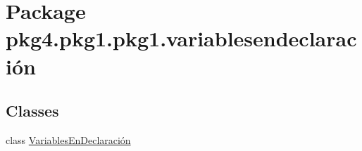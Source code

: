 \hypertarget{namespacepkg4_1_1pkg1_1_1pkg1_1_1variablesendeclaraci_xC3_xB3n}{}\section{Package pkg4.\+pkg1.\+pkg1.\+variablesendeclaración}
\label{namespacepkg4_1_1pkg1_1_1pkg1_1_1variablesendeclaraci_xC3_xB3n}
\subsection*{Classes}
\begin{DoxyCompactItemize}
\item 
class \mbox{\hyperlink{classpkg4_1_1pkg1_1_1pkg1_1_1variablesendeclaraci_xC3_xB3n_1_1_variables_en_declaraci_xC3_xB3n}{Variables\+En\+Declaración}}
\end{DoxyCompactItemize}
